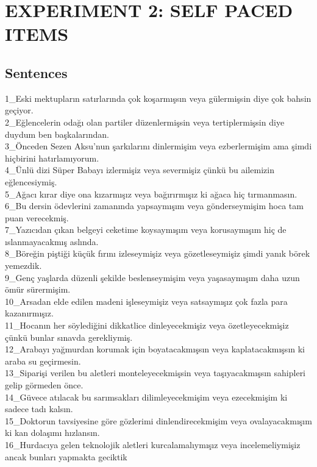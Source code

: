 \chapter{\MakeUppercase{experiment 2: self paced items}} \label{selfpaceditems}
\singlespacing
\section{Sentences}
\begin{myparindent}{0pt}
1\_Eski mektupların satırlarında çok koşarmışsın veya gülermişsin diye çok bahsin geçiyor. \\
2\_Eğlencelerin odağı olan partiler düzenlermişsin veya tertiplermişsin diye duydum ben başkalarından. \\
3\_Önceden Sezen Aksu'nun şarkılarını dinlermişim veya ezberlermişim ama şimdi hiçbirini hatırlamıyorum. \\
4\_Ünlü dizi Süper Babayı izlermişiz veya severmişiz çünkü bu ailemizin eğlencesiymiş. \\
5\_Ağacı kırar diye ona kızarmışız veya bağırırmışız ki ağaca hiç tırmanmasın. \\
6\_Bu dersin ödevlerini zamanında yapsaymışım veya gönderseymişim hoca tam puan verecekmiş. \\
7\_Yazıcıdan çıkan belgeyi ceketime koysaymışım veya korusaymışım hiç de ıslanmayacakmış aslında. \\
8\_Böreğin piştiği küçük fırını izleseymişiz veya gözetleseymişiz şimdi yanık börek yemezdik. \\
9\_Genç yaşlarda düzenli şekilde beslenseymişim veya yaşasaymışım daha uzun ömür sürermişim. \\
10\_Arsadan elde edilen madeni işleseymişiz veya satsaymışız çok fazla para kazanırmışız. \\
11\_Hocanın her söylediğini dikkatlice dinleyecekmişiz veya özetleyecekmişiz çünkü bunlar sınavda gerekliymiş. \\
12\_Arabayı yağmurdan korumak için boyatacakmışsın veya kaplatacakmışsın ki araba su geçirmesin. \\
13\_Siparişi verilen bu aletleri monteleyecekmişsin veya taşıyacakmışsın sahipleri gelip görmeden önce. \\
14\_Güvece atılacak bu sarımsakları dilimleyecekmişim veya ezecekmişim ki sadece tadı kalsın. \\
15\_Doktorun tavsiyesine göre gözlerimi dinlendirecekmişim veya ovalayacakmışım ki kan dolaşımı hızlansın. \\
16\_Hurdacıya gelen teknolojik aletleri kurcalamalıymışız veya incelemeliymişiz ancak bunları yapmakta geciktik \\

\end{myparindent}
